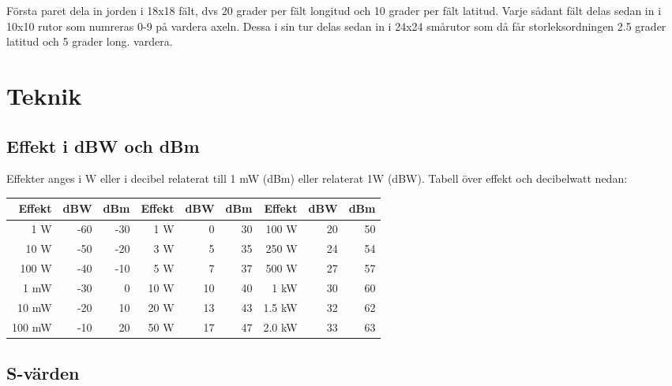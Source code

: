 Första paret dela in jorden i 18x18 fält, dvs 20 grader per fält longitud och 10 grader per fält latitud. Varje sådant fält delas sedan in i 10x10 rutor som numreras 0-9 på vardera axeln. Dessa i sin tur delas sedan in i 24x24 smårutor som då får storleksordningen 2.5 grader latitud och 5 grader long. vardera.

\section{Teknik}

\subsection{Effekt i dBW och dBm}

Effekter anges i W eller i decibel relaterat till 1 mW (dBm) eller relaterat 1W (dBW). Tabell över effekt och decibelwatt nedan:
\begin{center}
\begin{tabular}{rrr|rrr|rrr}
	   \textbf{Effekt} & \textbf{dBW} & \textbf{dBm} & \textbf{Effekt} & \textbf{dBW} & \textbf{dBm} & \textbf{Effekt} & \textbf{dBW} & \textbf{dBm} \\ \hline
	  1 \textmu W &          -60 &          -30 &        1 W &            0 &           30 &      100 W &           20 &           50 \\
	 10 \textmu W &          -50 &          -20 &        3 W &            5 &           35 &      250 W &           24 &           54 \\
	100 \textmu W &          -40 &          -10 &        5 W &            7 &           37 &      500 W &           27 &           57 \\
	         1 mW &          -30 &            0 &       10 W &           10 &           40 &       1 kW &           30 &           60 \\
	        10 mW &          -20 &           10 &       20 W &           13 &           43 &     1.5 kW &           32 &           62 \\
	       100 mW &          -10 &           20 &       50 W &           17 &           47 &     2.0 kW &           33 &           63
\end{tabular}
\end{center}

\subsection{S-värden}

